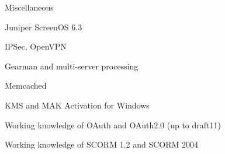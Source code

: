 \documentclass[margin,line]{resume}
\begin{document}
\begin{resume}
	Miscellaneous
	\begin{list2}
		\item Juniper ScreenOS 6.3
		\item IPSec, OpenVPN
		\item Gearman and multi-server processing
		\item Memcached
		\item KMS and MAK Activation for Windows
		\item Working knowledge of OAuth and OAuth2.0 (up to draft11)
		\item Working knowledge of SCORM 1.2 and SCORM 2004
	\end{list2}
\newpage
 


\end{resume}
\end{document}
